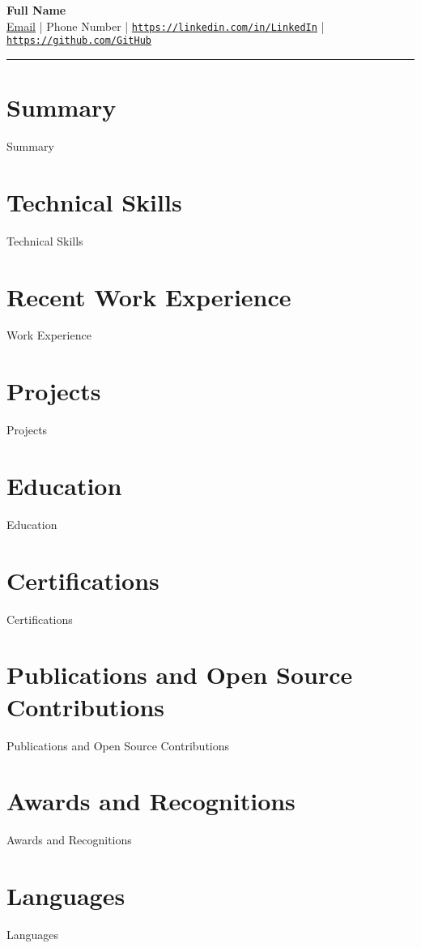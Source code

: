\documentclass[a4paper,10pt]{article}
\begin{document}
\begin{center}
    {\Huge \textbf{{{Full Name}}}}\\
    \href{mailto:{{Email}}}{{Email}} | {{Phone Number}} | 
    \href{https://linkedin.com/in/{{LinkedIn}}}{\texttt{https://linkedin.com/in/{{LinkedIn}}}} | 
    \href{https://github.com/{{GitHub}}}{\texttt{https://github.com/{{GitHub}}}}
\end{center}

\hrule

\section*{Summary}
{{Summary}}

\section*{Technical Skills}
\begin{itemize}
    {{Technical Skills}}
\end{itemize}

\section*{Recent Work Experience}
{{Work Experience}}

\section*{Projects}
{{Projects}}

\section*{Education}
{{Education}}

\section*{Certifications}
{{Certifications}}

\section*{Publications and Open Source Contributions}
{{Publications and Open Source Contributions}}

\section*{Awards and Recognitions}
{{Awards and Recognitions}}

\section*{Languages}
\begin{itemize}
    {{Languages}}
\end{itemize}
\end{document}
